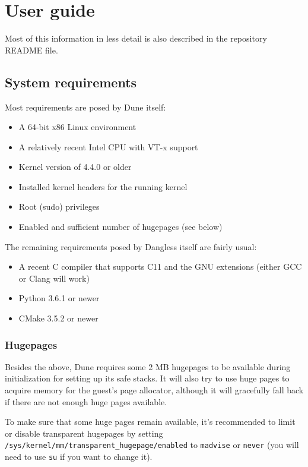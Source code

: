 \chapter{User guide}
\label{ch:user-guide}

Most of this information in less detail is also described in the repository README file.

\section{System requirements}

Most requirements are posed by Dune itself:

\begin{itemize}
	\item A 64-bit x86 Linux environment
	\item A relatively recent Intel CPU with VT-x support
	\item Kernel version of 4.4.0 or older
	\item Installed kernel headers for the running kernel
	\item Root (sudo) privileges
	\item Enabled and sufficient number of hugepages (see below)
\end{itemize}

The remaining requirements posed by Dangless itself are fairly usual:

\begin{itemize}
	\item A recent C compiler that supports C11 and the GNU extensions (either GCC or Clang will work)
	\item Python 3.6.1 or newer
	\item CMake 3.5.2 or newer
\end{itemize}

\subsection{Hugepages}

Besides the above, Dune requires some 2 MB hugepages to be available during initialization for setting up its safe stacks. It will also try to use huge pages to acquire memory for the guest's page allocator, although it will gracefully fall back if there are not enough huge pages available.

To make sure that some huge pages remain available, it's recommended to limit or disable transparent hugepages by setting \texttt{/sys/kernel/mm/transparent\_hugepage/enabled} to \texttt{madvise} or \texttt{never} (you will need to use \texttt{su} if you want to change it).

